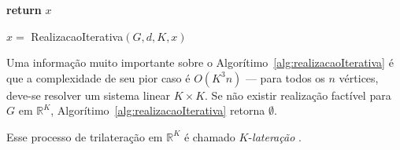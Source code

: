 \begin{algorithm}[H]
	\label{alg:realizacaoIterativa}
	\textbf{return} $x$\;
	\caption{$x =$ RealizacaoIterativa$(G,d, K, x)$ \cite{libertiEDG}}
\end{algorithm}
\vspace{0.5cm}
Uma informação muito importante sobre o Algorítimo~\ref{alg:realizacaoIterativa} é que a complexidade de seu pior caso é $O(K^3n)$ --- para todos os $n$ vértices, deve-se resolver um sistema linear $K\times K$. Se não existir realização factível para $G$ em $\mathbb{R}^K$, Algorítimo~\ref{alg:realizacaoIterativa} retorna $\emptyset$.

Esse processo de trilateração em $\mathbb{R}^K$ é chamado $K$-\textit{lateração} \cite{eren2004rigidity, libertiEDG}.



